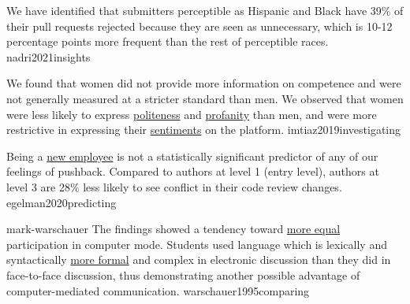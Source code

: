 \documentclass{article}
\begin{document}
  {We have identified that submitters perceptible as Hispanic and Black have 39\% of their pull requests rejected because they are seen as unnecessary, which is 10-12 percentage points more frequent than the rest of perceptible races.}
  {nadri2021insights}

  {We found that women did not provide more information on competence and were not generally measured at a stricter standard than men. We observed that women were less likely to express \ul{politeness} and \ul{profanity} than men, and were more restrictive in expressing their \ul{sentiments} on the platform.}
  {imtiaz2019investigating}

  {Being a \ul{new employee} is not a statistically significant predictor of any of our feelings of pushback. Compared to authors at level 1 (entry level), authors at level 3 are 28\% less likely to see conflict in their code review changes.}
  {egelman2020predicting}



\qte
  {mark-warschauer}
  {The findings showed a tendency toward \ul{more equal} participation in computer mode. Students used language which is lexically and syntactically \ul{more formal} and complex in electronic discussion than they did in face-to-face discussion, thus demonstrating another possible advantage of computer-mediated communication.}
  {warschauer1995comparing}
\end{document}
